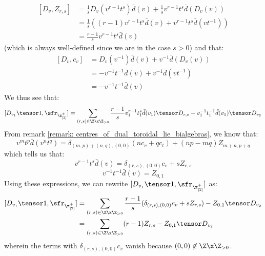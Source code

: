\begin{enumerate}
\begin{enumerate}
$$\begin{aligned}
                                        [D_v, Z_{r, s}] & = \frac1s D_v( v^{r - 1} t^s ) \bar{d}(v) + \frac1s v^{r - 1} t^s \bar{d}(D_v(v))
                                        \\
                                        & = \frac1s \left( (r - 1) v^{r - 1} t^s \bar{d}(v) + v^{r - 1} t^s \bar{d}(v t^{-1}) \right)
                                        \\
                                        & = \frac{r - 1}{s} v^{r - 1} t^s \bar{d}(v) 
                                    \end{aligned}
                                $$
                            (which is always well-defined since we are in the case $s > 0$) and that:
                                $$
                                    \begin{aligned}
                                        [D_v, c_v] & = D_v(v^{-1}) \bar{d}(v) + v^{-1} \bar{d}(D_v(v))
                                        \\
                                        & = -v^{-1} t^{-1} \bar{d}(v) + v^{-1} \bar{d}(v t^{-1})
                                        \\
                                        & = -v^{-1} t^{-1} \bar{d}(v)
                                    \end{aligned}
                                $$
                            We thus see that:
                                $$[D_{v_1} \tensor 1, \sfr_{\z_{[2]}^+}] = \sum_{(r, s) \in \Z \x \Z_{> 0}} \frac{r - 1}{s} v_1^{r - 1} t_1^s \bar{d}(v_1)  \tensor D_{r, s} - v_1^{-1} t_1^{-1} \bar{d}(v_1) \tensor D_{v_2}$$
                            From remark \ref{remark: centres_of_dual_toroidal_lie_bialgebras}, we know that:
                                $$v^m t^p \bar{d}(v^n t^q) = \delta_{(m, p) + (n, q), (0, 0)} ( n c_v + q c_t ) + (np - mq) Z_{m + n, p + q}$$
                            which tells us that:
                                $$v^{r - 1} t^s \bar{d}(v) = \delta_{(r, s), (0, 0)} c_v + s Z_{r, s}$$
                                $$v^{-1} t^{-1} \bar{d}(v) = Z_{0, 1}$$
                            Using these expressions, we can rewrite $[D_{v_1} \tensor 1, \sfr_{\z_{[2]}^+}]$ as:
                                $$
                                    \begin{aligned}
                                        [D_{v_1} \tensor 1, \sfr_{\z_{[2]}^+}] & = \sum_{(r, s) \in \Z \x \Z_{> 0}} \frac{r - 1}{s} ( \delta_{(r, s), (0, 0)} c_v + s Z_{r, s} ) - Z_{0, 1} \tensor D_{v_2}
                                        \\
                                        & = \sum_{(r, s) \in \Z \x \Z_{> 0}} (r - 1) Z_{r, s} - Z_{0, 1} \tensor D_{v_2}
                                    \end{aligned}
                                $$
                            wherein the terms with $\delta_{(r, s), (0, 0)} c_v$ vanish because $(0, 0) \not \in \Z \x \Z_{> 0}$. 
 

\end{enumerate}
\end{enumerate}
